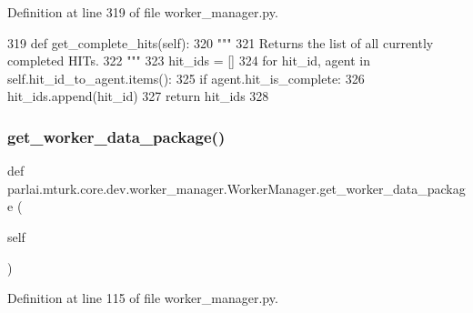 Definition at line 319 of file worker\+\_\+manager.\+py.


\begin{DoxyCode}
319     \textcolor{keyword}{def }get\_complete\_hits(self):
320         \textcolor{stringliteral}{"""}
321 \textcolor{stringliteral}{        Returns the list of all currently completed HITs.}
322 \textcolor{stringliteral}{        """}
323         hit\_ids = []
324         \textcolor{keywordflow}{for} hit\_id, agent \textcolor{keywordflow}{in} self.hit\_id\_to\_agent.items():
325             \textcolor{keywordflow}{if} agent.hit\_is\_complete:
326                 hit\_ids.append(hit\_id)
327         \textcolor{keywordflow}{return} hit\_ids
328 
\end{DoxyCode}
\mbox{\label{classparlai_1_1mturk_1_1core_1_1dev_1_1worker__manager_1_1WorkerManager_a25fea0a63f8cb6ba522162e7e219e945}} 
\subsubsection{\texorpdfstring{get\+\_\+worker\+\_\+data\+\_\+package()}{get\_worker\_data\_package()}}
{\footnotesize\ttfamily def parlai.\+mturk.\+core.\+dev.\+worker\+\_\+manager.\+Worker\+Manager.\+get\+\_\+worker\+\_\+data\+\_\+package (\begin{DoxyParamCaption}\item[{}]{self }\end{DoxyParamCaption})}



Definition at line 115 of file worker\+\_\+manager.\+py.


